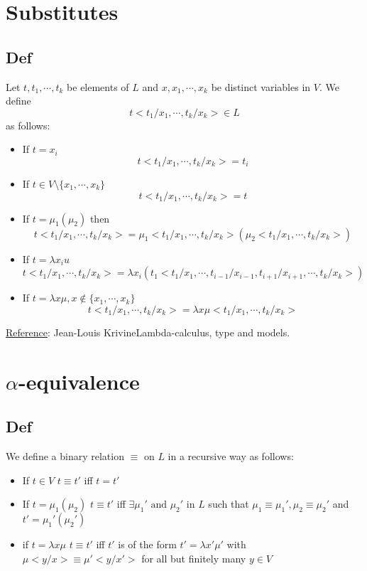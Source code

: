 \documentclass{book}
\begin{document}
\chapter{Substitutes}
\section{Def}
Let $t,t_1,\cdots,t_k$ be elements of $L$ and $x,x_1,\cdots,x_k$ be distinct variables in $V$. We define $$t<t_1/x_1,\cdots,t_k/x_k>\in L$$ as follows:
\begin{itemize}
    \item If $t=x_i$$$t<t_1/x_1,\cdots,t_k/x_k>=t_i$$
    \item If $t\in V\setminus\{x_1,\cdots,x_k\}$$$t<t_1/x_1,\cdots,t_k/x_k>=t$$
    \item If $t=\mu_1(\mu_2)$ then $$t<t_1/x_1,\cdots,t_k/x_k>=\mu_1<t_1/x_1,\cdots,t_k/x_k>(\mu_2<t_1/x_1,\cdots,t_k/x_k>)$$
    \item If $t=\lambda x_iu$$$t<t_1/x_1,\cdots,t_k/x_k>=\lambda x_i(t_1<t_1/x_1,\cdots,t_{i-1}/x_{i-1},t_{i+1}/x_{i+1},\cdots,t_k/x_k>)$$
    \item If $t=\lambda x\mu,x\not\in \{x_1,\cdots,x_k\}$$$t<t_1/x_1,\cdots,t_k/x_k>=\lambda x\mu<t_1/x_1,\cdots,t_k/x_k>$$
\end{itemize}
\underline{Reference}: Jean-Louis KrivineLambda-calculus, type and models.
\chapter{$\alpha$-equivalence}
\section{Def}
We define a binary relation $\equiv $ on $L$ in a recursive way as follows:
\begin{itemize}
    \item If $t\in V$ $t\equiv t'$ iff $t=t'$
    \item If $t=\mu_1(\mu_2)$ $t\equiv t'$ iff $\exists \mu_1'\text{ and }\mu_2'$ in $L$ such that $\mu_1\equiv \mu_1',\mu_2\equiv \mu_2'$ and $t'=\mu_1'(\mu_2')$ 
    \item if $t=\lambda x \mu$ $t\equiv t'$ iff $t'$ is of the form $t'=\lambda x'\mu'$ with $\mu<y/x>\equiv \mu'<y/x'>$ for all but finitely many $y\in V$
\end{itemize}
\end{document}
